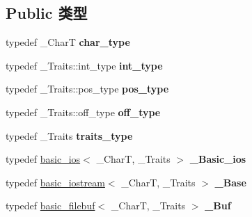 \subsection*{Public 类型}
\begin{DoxyCompactItemize}
\item 
\mbox{\label{classbasic__fstream_ac491350d10373ee8299b47f0496ed4a5}} 
typedef \+\_\+\+CharT {\bfseries char\+\_\+type}
\item 
\mbox{\label{classbasic__fstream_a7a75a37b4b74ba40b074b61cb1de757f}} 
typedef \+\_\+\+Traits\+::int\+\_\+type {\bfseries int\+\_\+type}
\item 
\mbox{\label{classbasic__fstream_a026e83f7392949db8dd5198e68d9b405}} 
typedef \+\_\+\+Traits\+::pos\+\_\+type {\bfseries pos\+\_\+type}
\item 
\mbox{\label{classbasic__fstream_a7ed7953c0405b22969a28280def0b980}} 
typedef \+\_\+\+Traits\+::off\+\_\+type {\bfseries off\+\_\+type}
\item 
\mbox{\label{classbasic__fstream_a890e026958284f2cddc5981418153eda}} 
typedef \+\_\+\+Traits {\bfseries traits\+\_\+type}
\item 
\mbox{\label{classbasic__fstream_a579f6f8190d3da04e233048a09df187d}} 
typedef \hyperlink{classbasic__ios}{basic\+\_\+ios}$<$ \+\_\+\+CharT, \+\_\+\+Traits $>$ {\bfseries \+\_\+\+Basic\+\_\+ios}
\item 
\mbox{\label{classbasic__fstream_ae01c23c7d1d04e60c02f832e60f275cb}} 
typedef \hyperlink{classbasic__iostream}{basic\+\_\+iostream}$<$ \+\_\+\+CharT, \+\_\+\+Traits $>$ {\bfseries \+\_\+\+Base}
\item 
\mbox{\label{classbasic__fstream_a4e6c13cb15759799131053e0c7be0a75}} 
typedef \hyperlink{classbasic__filebuf}{basic\+\_\+filebuf}$<$ \+\_\+\+CharT, \+\_\+\+Traits $>$ {\bfseries \+\_\+\+Buf}
\end{DoxyCompactItemize}
